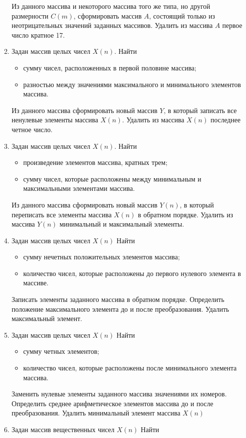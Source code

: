 \begin{enumerate}
Из данного массива и некоторого массива того же типа, но другой размерности $C(m)$,
сформировать массив $A$, состоящий только из неотрицательных значений заданных массивов. Удалить из
массива $A$ первое число кратное 17.
\item Задан массив целых чисел $X(n)$. Найти
\begin{itemize}
\item сумму чисел, расположенных в первой половине массива;
\item разностью между значениями максимального и минимального элементов массива.
\end{itemize}
Из данного массива сформировать новый массив $Y$, в который записать все ненулевые элементы
массива $X(n)$. Удалить из массива $X(n)$ последнее четное число.
\item Задан массив целых чисел $X(n)$. Найти
\begin{itemize}
\item произведение элементов массива, кратных трем;
\item сумму чисел, которые расположены между минимальным и максимальными элементами массива.
\end{itemize}
Из данного массива сформировать новый массив $Y(n)$, в который переписать все элементы
массива $X(n)$ в обратном порядке. Удалить из массива $Y(n)$
минимальный и максимальный элементы.
\item Задан массив целых чисел $X(n)$ Найти
\begin{itemize}
\item сумму нечетных положительных элементов массива;
\item количество чисел, которые расположены до первого нулевого элемента в массиве.
\end{itemize}
Записать элементы заданного массива в обратном порядке. Определить положение максимального элемента до и после
преобразования. Удалить максимальный элемент.
\item Задан массив целых чисел $X(n)$ Найти
\begin{itemize}
\item сумму четных элементов;
\item количество чисел, которые расположены после минимального элемента массива.
\end{itemize}
Заменить нулевые элементы заданного массива значениями их номеров. Определить среднее арифметическое элементов
массива до и после преобразования. Удалить минимальный элемент массива $X(n)$
\item Задан массив вещественных чисел $X(n)$ Найти

\end{enumerate}
